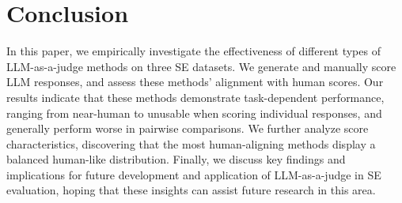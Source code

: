 \section{Conclusion\label{conclusion}}
In this paper, we empirically investigate the effectiveness of different types of LLM-as-a-judge methods on three SE datasets. We generate and manually score LLM responses, and assess these methods' alignment with human scores. Our results indicate that these methods demonstrate task-dependent performance, ranging from near-human to unusable when scoring individual responses, and generally perform worse in pairwise comparisons. We further analyze score characteristics, discovering that the most human-aligning methods display a balanced human-like distribution. Finally, we discuss key findings and implications for future development and application of LLM-as-a-judge in SE evaluation, hoping that these insights can assist future research in this area.